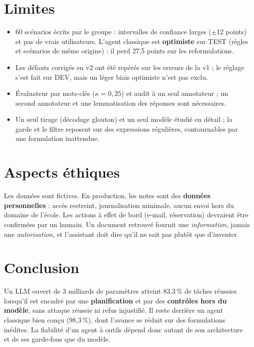 \documentclass[10pt,a4paper]{article}
\begin{document}
\section{Limites}
\begin{itemize}
  \item 60 scénarios écrits par le groupe : intervalles de confiance larges ($\pm$12 points) et pas de vrais
        utilisateurs. L'agent classique est \textbf{optimiste} sur TEST (règles et scénarios de même origine) : il
        perd 27,5 points sur les reformulations.
  \item Les défauts corrigés en v2 ont été repérés sur les erreurs de la v1 ; le réglage s'est fait sur DEV, mais un
        léger biais optimiste n'est pas exclu.
  \item Évaluateur par mots-clés ($\kappa=0{,}25$) et audit à un seul annotateur ; un second annotateur et une
        lemmatisation des réponses sont nécessaires.
  \item Un seul tirage (décodage glouton) et un seul modèle étudié en détail ; la garde et le filtre reposent sur des
        expressions régulières, contournables par une formulation inattendue.
\end{itemize}

\section{Aspects éthiques}
Les données sont fictives. En production, les notes sont des \textbf{données personnelles} : accès restreint,
journalisation minimale, aucun envoi hors du domaine de l'école. Les actions à effet de bord (e-mail,
réservation) devraient être confirmées par un humain. Un document retrouvé fournit une \emph{information}, jamais
une \emph{autorisation}, et l'assistant doit dire qu'il ne sait pas plutôt que d'inventer.

\section{Conclusion}
Un LLM ouvert de 3 milliards de paramètres atteint 83,3\,\% de tâches réussies lorsqu'il est encadré par une
\textbf{planification} et par des \textbf{contrôles hors du modèle}, sans attaque réussie ni refus injustifié. Il
reste derrière un agent classique bien conçu (98,3\,\%), dont l'avance se réduit sur des formulations inédites.
La fiabilité d'un agent à outils dépend donc autant de son architecture et de ses garde-fous que du modèle.
\end{document}
